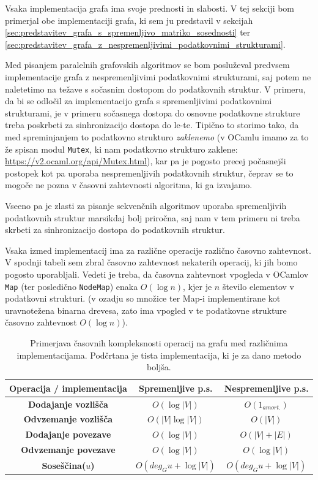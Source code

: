 \documentclass[mat1, tisk]{fmfdelo}
\begin{document}
Vsaka implementacija grafa ima svoje prednosti in slabosti. V tej sekciji bom primerjal obe implementaciji grafa, ki sem ju predstavil v 
sekcijah \ref{sec:predstavitev_grafa_s_spremenljivo_matriko_sosednosti} ter \ref{sec:predstavitev_grafa_z_nespremenljivimi_podatkovnimi_strukturami}.

Med pisanjem paralelnih grafovskih algoritmov se bom posluževal predvsem implementacije grafa z nespremenljivimi podatkovnimi strukturami, saj potem ne
naletetimo na težave s sočasnim dostopom do podatkovnih struktur. V primeru, da bi se odločil za implementacijo grafa s spremenljivimi podatkovnimi strukturami, je v
primeru sočasnega dostopa do osnovne podatkovne strukture treba poskrbeti za sinhronizacijo dostopa do le-te. Tipično to storimo tako, da med spreminjanjem to podatkovno
strukturo \textit{zaklenemo} (v OCamlu imamo za to že spisan modul \texttt{Mutex}, ki nam podatkovno strukturo zaklene: \url{https://v2.ocaml.org/api/Mutex.html}),
kar pa je pogosto precej počasnejši postopek kot pa uporaba nespremenljivih podatkovnih struktur, čeprav se to mogoče ne pozna v časovni zahtevnosti algoritma, ki ga izvajamo.

Vseeno pa je zlasti za pisanje sekvenčnih algoritmov uporaba spremenljivih podatkovnih struktur marsikdaj bolj priročna, saj nam v tem primeru ni treba skrbeti za sinhronizacijo 
dostopa do podatkovnih struktur.

Vsaka izmed implementacij ima za različne operacije različno časovno zahtevnost. V spodnji tabeli sem zbral časovno zahtevnost nekaterih operacij, ki jih bomo pogosto uporabljali.
Vedeti je treba, da časovna zahtevnost vpogleda v OCamlov \texttt{Map} (ter posledično \texttt{NodeMap}) enaka $O(\log n)$, kjer je $n$ število elementov v podatkovni strukturi.
(v ozadju so množice ter Map-i implementirane kot uravnotežena binarna drevesa, zato ima vpogled v te podatkovne strukture časovno zahtevnost $O(\log n)$).

\begin{table}[h]
  \centering
  \begin{tabular}{|c|c|c|}
  \hline
  \textbf{Operacija / implementacija} & \textbf{Spremenljive p.s.} & \textbf{Nespremenljive p.s.} \\ \hline
  \textbf{Dodajanje vozlišča} & $O(\log |V|)$ & \underline{$O(1_{amort.})$} \\ \hline
  \textbf{Odvzemanje vozlišča} & $O(|V| \log |V|)$ & \underline{$O(|V|)$} \\ \hline
  \textbf{Dodajanje povezave} & \underline{$O(\log |V|)$} & $O(|V| + |E|)$ \\ \hline
  \textbf{Odvzemanje povezave} & \underline{$O(\log |V|)$} & \underline{$O(\log |V|)$} \\ \hline
  \textbf{Soseščina($u$)} & \underline{$O(deg_Gu + \log |V|)$} & \underline{$O(deg_Gu + \log |V|)$} \\ \hline
  \end{tabular}
  \caption{Primerjava časovnih kompleksnosti operacij na grafu med različnima implementacijama. Podčrtana je tista 
  implementacija, ki je za dano metodo boljša.}
  \label{tab:primerjava_casovnih_kompleksnosti_operacij_na_grafu_med_razlicnima_implementacijama}
  \end{table}
\end{document}
